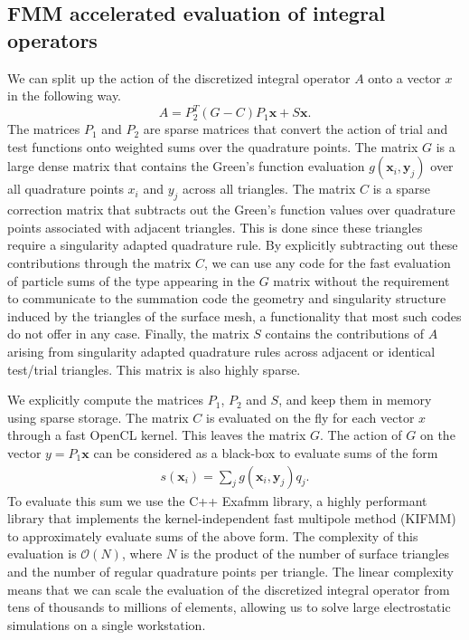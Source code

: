 \subsection{FMM accelerated evaluation of integral operators}
We can split up the action of the discretized integral operator $A$ onto a vector $x$ in the following way.
$$
A = P_2^T (G - C)P_1 \mathbf{x} + S \mathbf{x}.
$$
The matrices $P_1$ and $P_2$ are sparse matrices that convert the action of trial and test functions onto weighted sums over the quadrature points.
The matrix $G$ is a large dense matrix that contains the Green's function evaluation $g(\mathbf{x}_i, \mathbf{y}_j)$ over all quadrature points $x_i$ and $y_j$ across all triangles.
The matrix $C$ is a sparse correction matrix that subtracts out the Green's function values over quadrature points associated with  adjacent triangles.
This is done since these triangles require a singularity adapted quadrature rule.
By explicitly subtracting out these contributions through the matrix $C$, we can use any code for the fast evaluation of particle sums of the type appearing in the $G$ matrix without the requirement to communicate to the summation code the geometry and singularity structure induced by the triangles of the surface mesh, a functionality that most such codes do not offer in any case.
Finally, the matrix $S$ contains the contributions of $A$ arising from singularity adapted quadrature rules across adjacent or identical test/trial triangles.
This matrix is also highly sparse.

We explicitly compute the matrices $P_1$, $P_2$ and $S$, and keep them in memory using sparse storage.
The matrix $C$ is evaluated on the fly for each vector $x$ through a fast OpenCL kernel.
This leaves the matrix $G$.
The action of $G$ on the vector $y=P_1 \mathbf{x}$ can be considered as a black-box to evaluate sums of the form
%
\begin{align}\label{eq:nbody_sum}
s(\mathbf{x}_i) = \sum_j g(\mathbf{x}_i, \mathbf{y}_j)q_j.
\end{align}
%
To evaluate this sum we use the C++ Exafmm library, a highly performant library that implements the kernel-independent fast multipole method (KIFMM) to approximately evaluate sums of the above form.
The complexity of this evaluation is $\mathcal{O}(N)$, where $N$ is the product of the number of surface triangles and the number of regular quadrature points per triangle.
The linear complexity means that we can scale the evaluation of the discretized integral operator from tens of thousands to millions of elements, allowing us to solve large  electrostatic simulations on a single workstation.
